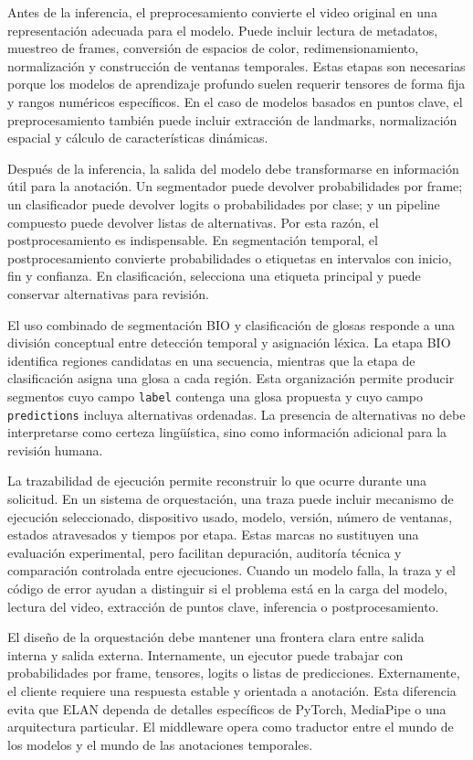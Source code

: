 Antes de la inferencia, el preprocesamiento convierte el video original en una representación adecuada para el modelo. Puede incluir lectura de metadatos, muestreo de frames, conversión de espacios de color, redimensionamiento, normalización y construcción de ventanas temporales. Estas etapas son necesarias porque los modelos de aprendizaje profundo suelen requerir tensores de forma fija y rangos numéricos específicos. En el caso de modelos basados en puntos clave, el preprocesamiento también puede incluir extracción de landmarks, normalización espacial y cálculo de características dinámicas.

Después de la inferencia, la salida del modelo debe transformarse en información útil para la anotación. Un segmentador puede devolver probabilidades por frame; un clasificador puede devolver logits o probabilidades por clase; y un pipeline compuesto puede devolver listas de alternativas. Por esta razón, el postprocesamiento es indispensable. En segmentación temporal, el postprocesamiento convierte probabilidades o etiquetas en intervalos con inicio, fin y confianza. En clasificación, selecciona una etiqueta principal y puede conservar alternativas para revisión.

El uso combinado de segmentación BIO y clasificación de glosas responde a una división conceptual entre detección temporal y asignación léxica. La etapa BIO identifica regiones candidatas en una secuencia, mientras que la etapa de clasificación asigna una glosa a cada región. Esta organización permite producir segmentos cuyo campo \texttt{label} contenga una glosa propuesta y cuyo campo \texttt{predictions} incluya alternativas ordenadas. La presencia de alternativas no debe interpretarse como certeza lingüística, sino como información adicional para la revisión humana.

La trazabilidad de ejecución permite reconstruir lo que ocurre durante una solicitud. En un sistema de orquestación, una traza puede incluir mecanismo de ejecución seleccionado, dispositivo usado, modelo, versión, número de ventanas, estados atravesados y tiempos por etapa. Estas marcas no sustituyen una evaluación experimental, pero facilitan depuración, auditoría técnica y comparación controlada entre ejecuciones. Cuando un modelo falla, la traza y el código de error ayudan a distinguir si el problema está en la carga del modelo, lectura del video, extracción de puntos clave, inferencia o postprocesamiento.

El diseño de la orquestación debe mantener una frontera clara entre salida interna y salida externa. Internamente, un ejecutor puede trabajar con probabilidades por frame, tensores, logits o listas de predicciones. Externamente, el cliente requiere una respuesta estable y orientada a anotación. Esta diferencia evita que ELAN dependa de detalles específicos de PyTorch, MediaPipe o una arquitectura particular. El middleware opera como traductor entre el mundo de los modelos y el mundo de las anotaciones temporales.

